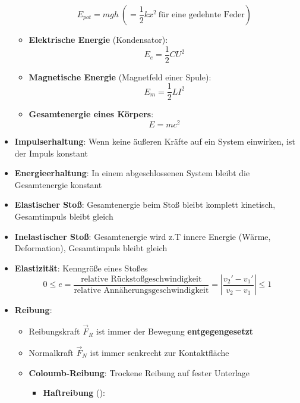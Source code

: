 \begin{itemize}
\begin{itemize}
		\begin{equation}
			E_{pot} = mgh\ (= \frac{1}{2}kx^2\ \text{für eine gedehnte Feder})
		\end{equation}
		\item \textbf{Elektrische Energie} (Kondensator):
		\begin{equation}
			E_e = \frac{1}{2}CU^2
		\end{equation}
		\item \textbf{Magnetische Energie} (Magnetfeld einer Spule):
		\begin{equation}
			E_m = \frac{1}{2}LI^2
		\end{equation}
		\item \textbf{Gesamtenergie eines Körpers}:
		\begin{equation}
			E = mc^2
		\end{equation}
	\end{itemize}
	\item \textbf{Impulserhaltung}: Wenn keine äußeren Kräfte auf ein System einwirken, ist der Impuls konstant
	\item \textbf{Energieerhaltung}: In einem abgeschlossenen System bleibt die Gesamtenergie konstant
	\item \textbf{Elastischer Stoß}: Gesamtenergie beim Stoß bleibt komplett kinetisch, Gesamtimpuls bleibt gleich
	\item \textbf{Inelastischer Stoß}: Gesamtenergie wird z.T innere Energie (Wärme, Deformation), Gesamtimpuls bleibt gleich
	\item \textbf{Elastizität}: Kenngröße eines Stoßes
	\begin{equation}
		0 \leq e = \frac{\text{relative Rückstoßgeschwindigkeit}}{\text{relative Annäherungsgeschwindigkeit}} = |\frac{v_2' - v_1'}{v_2 - v_1}| \leq 1
	\end{equation}
	\item \textbf{Reibung}:
	\begin{itemize}
		\item Reibungskraft $\vec{F}_R$ ist immer der Bewegung \textbf{entgegengesetzt}
		\item Normalkraft $\vec{F}_N$ ist immer senkrecht zur Kontaktfläche
		\item \textbf{Coloumb-Reibung}: Trockene Reibung auf fester Unterlage
		\begin{itemize}
			\item \textbf{Haftreibung} ():
		\end{itemize}
		\begin{equation}

\end{equation}
\end{itemize}
\end{itemize}
